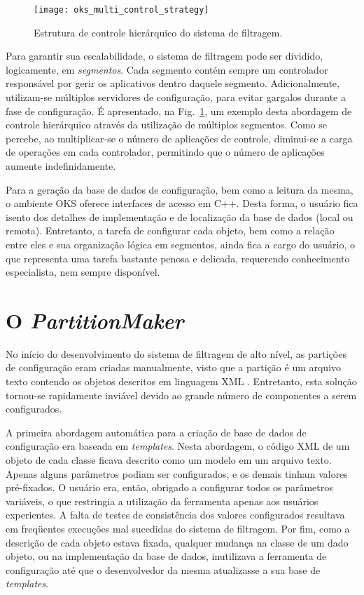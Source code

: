 \begin{figure}
\begin{center}
\texttt{[image: oks\_multi\_control\_strategy]}
\caption{Estrutura de controle hierárquico do sistema de filtragem.}
\label{fig:multi_control}
\end{center}
\end{figure}

Para garantir sua escalabilidade, o sistema de filtragem pode ser dividido, logicamente, em \emph{segmentos}. Cada segmento contém sempre um controlador responsável por gerir os aplicativos dentro daquele segmento. Adicionalmente, utilizam-se múltiplos servidores de configuração, para evitar gargalos durante a fase de configuração. É apresentado, na Fig.~\ref{fig:multi_control}, um exemplo desta abordagem de controle hierárquico através da utilização de múltiplos segmentos. Como se percebe, ao multiplicar-se o número de aplicações de controle, diminui-se a carga de operações em cada controlador, permitindo que o número de aplicações aumente indefinidamente.  

Para a geração da base de dados de configuração, bem como a leitura da mesma, o ambiente OKS oferece interfaces de acesso em C++. Desta forma, o usuário fica isento dos detalhes de implementação e de localização da base de dados (local ou remota). Entretanto, a tarefa de configurar cada objeto, bem como a relação entre eles e sua organização lógica em segmentos, ainda fica a cargo do usuário, o que representa uma tarefa bastante penosa e delicada, requerendo conhecimento especialista, nem sempre disponível.


\section{O \emph{PartitionMaker}}
\label{sec:pm}

No início do desenvolvimento do sistema de filtragem de alto nível, as partições de configuração eram criadas manualmente, visto que a partição é um arquivo texto contendo os objetos descritos em linguagem XML \cite{bib:xml}. Entretanto, esta solução tornou-se rapidamente inviável devido ao grande número de componentes a serem configurados.

A primeira abordagem automática para a criação de base de dados de configuração era baseada em \emph{templates}. Nesta abordagem, o código XML de um objeto de cada classe ficava descrito como um modelo em um arquivo texto. Apenas alguns parâmetros podiam ser configurados, e os demais tinham valores pré-fixados. O usuário era, então, obrigado a configurar todos os parâmetros variáveis, o que restringia a utilização da ferramenta apenas aos usuários experientes. A falta de testes de consistência dos valores configurados resultava em freqüentes execuções mal sucedidas do sistema de filtragem. Por fim, como a descrição de cada objeto estava fixada, qualquer mudança na classe de um dado objeto, ou na implementação da base de dados, inutilizava a ferramenta de configuração até que o desenvolvedor da mesma atualizasse a sua base de \emph{templates}.


